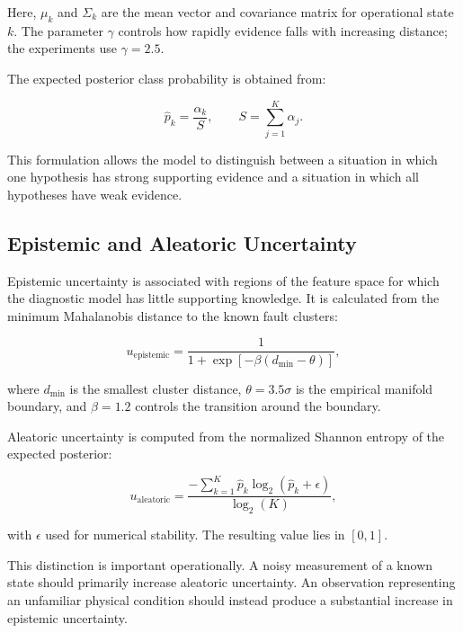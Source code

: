 \documentclass[conference]{IEEEtran}
\begin{document}
Here, $\mu_k$ and $\Sigma_k$ are the mean vector and covariance matrix for operational state $k$. The parameter $\gamma$ controls how rapidly evidence falls with increasing distance; the experiments use $\gamma=2.5$.

The expected posterior class probability is obtained from:

\begin{equation}
\hat{p}_k=\frac{\alpha_k}{S}, \qquad S=\sum_{j=1}^{K}\alpha_j.
\label{eq:posterior}
\end{equation}

This formulation allows the model to distinguish between a situation in which one hypothesis has strong supporting evidence and a situation in which all hypotheses have weak evidence.

\subsection{Epistemic and Aleatoric Uncertainty}

Epistemic uncertainty is associated with regions of the feature space for which the diagnostic model has little supporting knowledge. It is calculated from the minimum Mahalanobis distance to the known fault clusters:

\begin{equation}
u_{\mathrm{epistemic}} = \frac{1}{1+\exp[-\beta(d_{\min}-\theta)]},
\label{eq:epistemic}
\end{equation}

where $d_{\min}$ is the smallest cluster distance, $\theta=3.5\sigma$ is the empirical manifold boundary, and $\beta=1.2$ controls the transition around the boundary.

Aleatoric uncertainty is computed from the normalized Shannon entropy of the expected posterior:

\begin{equation}
u_{\mathrm{aleatoric}} = \frac{-\sum_{k=1}^{K}\hat{p}_k \log_2(\hat{p}_k+\epsilon)}{\log_2(K)},
\label{eq:aleatoric}
\end{equation}

with $\epsilon$ used for numerical stability. The resulting value lies in $[0,1]$.

This distinction is important operationally. A noisy measurement of a known state should primarily increase aleatoric uncertainty. An observation representing an unfamiliar physical condition should instead produce a substantial increase in epistemic uncertainty.
\end{document}
